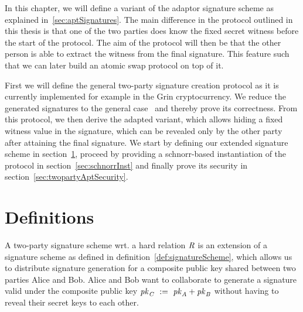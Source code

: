 In this chapter, we will define a variant of the adaptor signature scheme as explained in~\ref{sec:aptSignatures}. The main difference in the protocol outlined in this thesis is that one of the two parties does know the fixed secret witness before the start of the protocol. The aim of the protocol will then be that the other person is able to extract the witness from the final signature. This feature such that we can later build an atomic swap protocol on top of it.  

First we will define the general two-party signature creation protocol as it is currently implemented for example in the Grin cryptocurrency.
We reduce the generated signatures to the general case~\cite{schnorr1989efficient} and thereby prove its correctness.
From this protocol, we then derive the adapted variant, which allows hiding a fixed witness
value in the signature, which can be revealed only by the other party after attaining the final signature.
We start by defining our extended signature scheme in section~\ref{sec:definitions}, proceed by providing a schnorr-based instantiation of the protocol in section~\ref{sec:schnorrInst} and finally prove its security in section~\ref{sec:twopartyAptSecurity}.

\section{Definitions}\label{sec:definitions}

A two-party signature scheme wrt. a hard relation $\mathit{R}$  is an extension of a signature scheme as defined in definition~\ref{def:signatureScheme}, which allows us to distribute signature generation for a composite public key shared between two parties Alice and Bob.
    Alice and Bob want to collaborate to generate a signature valid under the composite public key $\mathit{pk}_{\mathit{C}} ~:=~ \mathit{pk}_{\mathit{A}} + \mathit{pk}_{\mathit{B}}$  without having to reveal their secret keys to each other.
    
    
    
